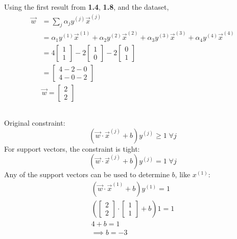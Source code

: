 \documentclass{article}
\begin{document}
\subsection{}
Using the first result from \textbf{1.4}, \textbf{1.8}, and the dataset,
\begin{align*}
\vec{w} &= \sum_j \alpha_j y^{(j)} \vec{x}^{(j)} \\
&= \alpha_1 y^{(1)} \vec{x}^{(1)} + \alpha_2 y^{(2)} \vec{x}^{(2)} + \alpha_3 y^{(3)} \vec{x}^{(3)} + \alpha_4 y^{(4)} \vec{x}^{(4)} \\
&= 4 \begin{bmatrix} 1 \\ 1 \end{bmatrix} - 2 \begin{bmatrix} 1 \\ 0 \end{bmatrix} - 2 \begin{bmatrix} 0 \\ 1 \end{bmatrix} \\
&= \begin{bmatrix} 4-2-0\\ 4-0-2 \end{bmatrix} \\
& \boxed{\vec{w} = \begin{bmatrix} 2 \\ 2 \end{bmatrix}}
\end{align*}

\subsection{}
Original constraint: $$ (\vec{w} \cdot \vec{x}^{(j)} + b) y^{(j)} \geq 1 \; \forall j$$
For support vectors, the constraint is tight: $$ (\vec{w} \cdot \vec{x}^{(j)} + b) y^{(j)} = 1 \; \forall j$$
Any of the support vectors can be used to determine $b$, like $x^{(1)}$:
\begin{align*}
(\vec{w} \cdot \vec{x}^{(1)} + b) y^{(1)} = 1 \\
\left( \begin{bmatrix} 2 \\ 2 \end{bmatrix} \cdot \begin{bmatrix} 1 \\ 1 \end{bmatrix} + b \right) 1 = 1 \\
4 + b = 1 \\
\implies \boxed{b = -3 }
\end{align*}
\end{document}
